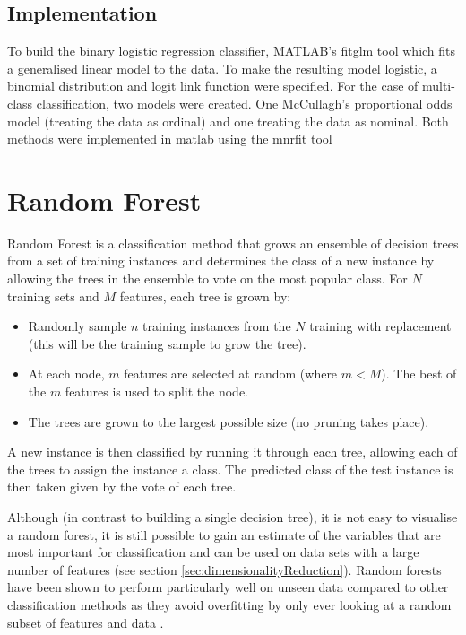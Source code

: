 \orderedLogit
\subsection{Implementation}

To build the binary logistic regression classifier, MATLAB's fitglm tool which fits a generalised linear model to the data. To make the resulting model logistic, a binomial distribution and logit link function were specified. For the case of multi-class classification, two models were created. One McCullagh's proportional odds model (treating the data as ordinal) and one treating the data as nominal. Both methods were implemented in matlab using the mnrfit tool

\section{Random Forest}

Random Forest is a classification method that grows an ensemble of decision trees from a set of training instances and determines the class of a new instance by allowing the trees in the ensemble to vote on the most popular class. For $N$ training sets and $M$ features, each tree is grown by:

\begin{itemize}
\item Randomly sample $n$ training instances from the $N$ training with replacement (this will be the training sample to grow the tree).
\item At each node, $m$ features are selected at random (where $m < M$). The best of the $m$ features is used to split the node.
\item The trees are grown to the largest possible size (no pruning takes place).
\end{itemize}

A new instance is then classified by running it through each tree, allowing each of the trees to assign the instance a class. The predicted class of the test instance is then taken given by the vote of each tree.

Although (in contrast to building a single decision tree), it is not easy to visualise a random forest, it is still possible to gain an estimate of the variables that are most important for classification and can be used on data sets with a large number of features (see section \ref{sec:dimensionalityReduction}). Random forests have been shown to perform particularly well on unseen data compared to other classification methods as they avoid overfitting by only ever looking at a random subset of features and data \cite{Breiman}. 


